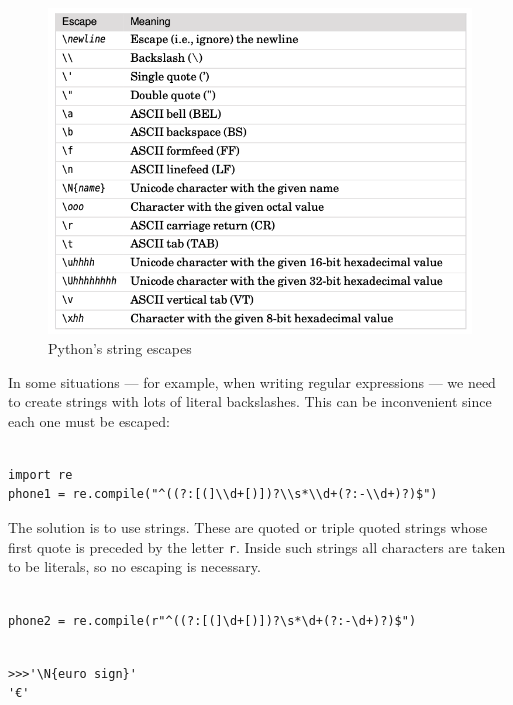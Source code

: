 \begin{figure}[!ht]
  \centering
  \includegraphics[width=\textwidth]{pics/escapes}
  \caption{Python's string escapes }
  \label{fig:escapes}
\end{figure}

In some situations --- for example, when writing regular expressions --- we need to create strings with lots of literal backslashes.
This can be inconvenient since each one must be escaped:
\begin{lstlisting}

import re
phone1 = re.compile("^((?:[(]\\d+[)])?\\s*\\d+(?:-\\d+)?)$")
\end{lstlisting}


The solution is to use  strings.
These are quoted or triple quoted strings whose first quote is preceded by the letter \verb|r|.
Inside such strings all characters are taken to be literals, so no escaping is necessary.

\begin{lstlisting}

phone2 = re.compile(r"^((?:[(]\d+[)])?\s*\d+(?:-\d+)?)$")
\end{lstlisting}



\begin{lstlisting}

>>>'\N{euro sign}'
'€'
\end{lstlisting}



